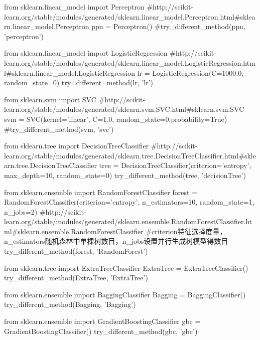 \documentclass[a4paper]{article}
\begin{document}
\begin{python}
			
			from sklearn.linear_model import Perceptron
			#http://scikit-learn.org/stable/modules/generated/sklearn.linear_model.Perceptron.html#sklearn.linear_model.Perceptron
			ppn = Perceptron()
			#try_different_method(ppn, 'perceptron')
			
			from sklearn.linear_model import LogisticRegression
			#http://scikit-learn.org/stable/modules/generated/sklearn.linear_model.LogisticRegression.html#sklearn.linear_model.LogisticRegression
			lr = LogisticRegression(C=1000.0, random_state=0)
			try_different_method(lr, 'lr')
			
			
			from sklearn.svm import SVC
			#http://scikit-learn.org/stable/modules/generated/sklearn.svm.SVC.html#sklearn.svm.SVC
			svm = SVC(kernel='linear', C=1.0, random_state=0,probability=True)
			#try_different_method(svm, 'svc')
			
			from sklearn.tree import DecisionTreeClassifier
			#http://scikit-learn.org/stable/modules/generated/sklearn.tree.DecisionTreeClassifier.html#sklearn.tree.DecisionTreeClassifier
			tree = DecisionTreeClassifier(criterion='entropy', max_depth=10, random_state=0)
			try_different_method(tree, 'decisionTree')
			
			from sklearn.ensemble import RandomForestClassifier
			forest = RandomForestClassifier(criterion='entropy', n_estimators=10, random_state=1, n_jobs=2)
			#http://scikit-learn.org/stable/modules/generated/sklearn.ensemble.RandomForestClassifier.html#sklearn.ensemble.RandomForestClassifier
			#criterion特征选择度量，n_estimators随机森林中单棵树数目，n_jobs设置并行生成树模型得数目
			try_different_method(forest, 'RandomForest')
			
			from sklearn.tree import ExtraTreeClassifier 
			ExtraTree = ExtraTreeClassifier()
			try_different_method(ExtraTree, 'ExtraTree')
			
			from sklearn.ensemble import BaggingClassifier
			Bagging = BaggingClassifier()
			try_different_method(Bagging, 'Bagging')
			
			from sklearn.ensemble import GradientBoostingClassifier
			gbc = GradientBoostingClassifier()
			try_different_method(gbc, 'gbc')
		\end{python}
\end{document}
